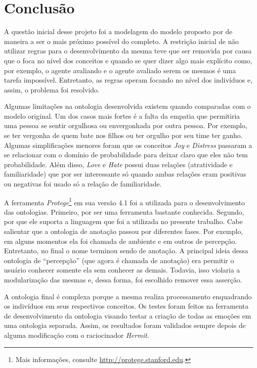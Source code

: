 \chapter{Conclusão} \label{cap:c}

A questão inicial desse projeto foi a modelagem do modelo proposto por
\citet{ortony1988cse} de maneira a ser o mais próximo possível do completo. A
restrição inicial de não utilizar regras para o desenvolvimento da mesma teve
que ser removida por causa que o \OWL foca no nível dos conceitos e quando se
quer dizer algo mais explícito como, por exemplo, o agente avaliando e o
agente avaliado serem os mesmos é uma tarefa impossível. Entretanto, as regras
operam focando no nível dos indivíduos e, assim, o problema foi resolvido.

Algumas limitações na ontologia desenvolvida existem quando comparadas com o
modelo original. Um dos casos mais fortes é a falta da empatia que permitiria
uma pessoa se sentir orgulhosa ou envergonhada por outra pessoa. Por exemplo,
se ter vergonha de quem bate nos filhos ou ter orgulho por seu time ter ganho.
Algumas simplificações menores foram que os conceitos \emph{Joy} e
\emph{Distress} passaram a se relacionar com o domínio de probabilidade para
deixar claro que eles não tem probabilidade. Além disso, \emph{Love} e
\emph{Hate} possui duas relações (atratividade e familiaridade) que por ser
interessante só quando ambas relações eram positivas ou negativas foi usado só
a relação de familiaridade.

A ferramenta \emph{Protege}\footnote{Mais informações, consulte \url{http://protege.stanford.edu}.}
em sua versão 4.1 foi a utilizada para o desenvolvimento das ontologias.
Primeiro, por ser uma ferramenta bastante conhecida. Segundo, por que ele
suporta a linguagem  que foi a utilizada no presente trabalho.
%
Cabe salientar que a ontologia de anotação passou por diferentes fases. Por
exemplo, em alguns momentos ela foi chamada de ambiente e em outros de
percepção. Entretanto, no final o nome terminou sendo de anotação. A principal
ideia dessa ontologia de ``percepção'' (que agora é chamada de anotação) era
permitir o usuário conhecer somente ela sem conhecer as demais. Todavia, isso
violaria a modularização das mesmas e, dessa forma, foi escolhido remover essa
asserção.

A ontologia final é complexa porque a mesma realiza processamento enquadrando
os indivíduos em seus respectivos conceitos. Os testes foram feitos na
ferramenta de desenvolvimento da ontologia visando testar a criação de todas
as emoções em uma ontologia separada. Assim, os resultados foram validados
sempre depois de alguma modificação com o raciocinador \emph{Hermit}.

